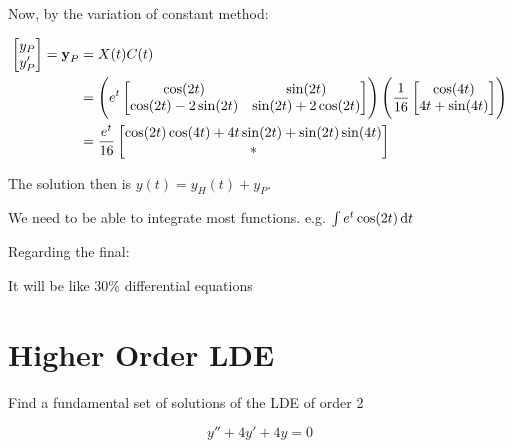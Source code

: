 \begin{sol}
		Now, by the variation of constant method:

		\begin{align}
			\begin{bmatrix}
				y_P\\y_P'
			\end{bmatrix} = \bm{\mathrm{y}}_P &= X(t)C(t)\\
			&= \left(e^t \begin{bmatrix}
				\cos(2t) & \sin(2t)\\
				\cos(2t) - 2\sin(2t) & \sin(2t) + 2\cos(2t)
			\end{bmatrix}\right) \left(\frac{1}{16} \begin{bmatrix}
				\cos(4t)\\
				4t + \sin(4t)
			\end{bmatrix}\right)\\
			&= \frac{e^t}{16} \begin{bmatrix}
				\cos(2t)\cos(4t) + 4t\sin(2t) + \sin(2t)\sin(4t)\\
				*
			\end{bmatrix}
		\end{align}

		The solution then is $y(t) = y_H(t) + y_P$.
	\end{sol}

	\begin{remark}
		We need to be able to integrate most functions. e.g. $\int e^t\cos(2t) \D t$
	\end{remark}

	\begin{tcolorbox}
		Regarding the final:

		It will be like 30\% differential equations
	\end{tcolorbox}

	\section{Higher Order LDE}

	\begin{example}
		Find a fundamental set of solutions of the LDE of order 2

		\[y'' + 4y' + 4y = 0\]
	\end{example}
	
